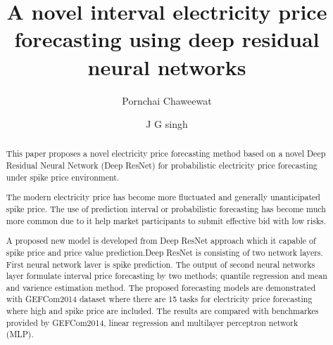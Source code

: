 \documentclass[review]{elsarticle}
\begin{document}
  \begin{frontmatter}

    \title{A novel interval electricity price forecasting using deep residual neural networks}

    \author{Pornchai Chaweewat}
    \author{J G singh}

    \address{Department of Energy, Environmental and Climate Change, School of Environmental, Resource and Development, Asian Institute of Thechnology, Thailand}


    \begin{abstract}
      This paper proposes a novel electricity price forecasting method based on a novel Deep Residual Neural Network (Deep ResNet) for probabilistic electricity price forecasting under spike price environment.

      The modern electricity price has become more fluctuated and generally unanticipated spike price. The use of prediction interval or probabilistic forecasting has become much more common due to it help market participants to submit effective bid with low risks.

      A proposed new model is developed from Deep ResNet approach which it capable of spike price and price value prediction.Deep ResNet is consisting of two network layers. First neural network laver is spike prediction. The output of second neural networks layer formulate interval price forecasting by two methods; quantile regression and mean and varience estimation method. The proposed forecasting models are demonstrated with GEFCom2014 dataset where there are 15 tasks for electricity price forecasting where high and spike price are included. The results are compared with benchmarkes provided by GEFCom2014, linear regression and multilayer perceptron network (MLP).


\end{abstract}
\end{frontmatter}
\end{document}
